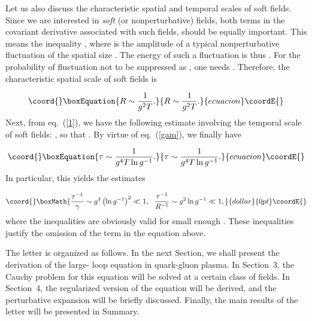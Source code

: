 \documentclass[a4paper,12pt]{article}
\begin{document}
Let us also discuss the characteristic spatial and temporal scales of soft fields. Since we are interested in {\it soft}
(or nonperturbative) fields, both terms in the covariant derivative associated with such fields, should be equally important.
This means the inequality \coordHE{}, where \coordHE{} is the amplitude of a typical nonperturbative
fluctuation of the spatial size \coordHE{}. The energy of such a fluctuation is thus \coordHE{}.
For the probability of fluctuation not to be suppressed as \coordHE{}, one
needs \coordHE{}. Therefore, the characteristic spatial scale of soft fields is

\begin{equation}\coord{}\boxEquation{
\label{spa}
R\sim\frac{1}{g^2T}.
}{
R\sim\frac{1}{g^2T}.
}{ecuacion}\coordE{}\end{equation}
Next, from eq.~(\ref{1}), we have the following estimate involving the temporal scale \myHighlight{$\tau$}\coordHE{} of soft fields: \coordHE{}, so that \coordHE{}. By virtue of eq.~(\ref{gam}),
we finally have

\begin{equation}\coord{}\boxEquation{
\label{tem}
\tau\sim\frac{1}{g^4T\ln g^{-1}}.
}{
\tau\sim\frac{1}{g^4T\ln g^{-1}}.
}{ecuacion}\coordE{}\end{equation}
In particular, this yields the estimates


$$\coord{}\boxMath{
\frac{\tau^{-1}}{\gamma}\sim g^4\left(\ln g^{-1}\right)^2\ll1,~~
\frac{\tau^{-1}}{R^{-1}}\sim g^2\ln g^{-1}\ll1,}{dollar}{0pt}\coordE{}$$
where the inequalities are obviously valid for small enough \coordHE{}. These inequalities justify
the omission of the term \coordHE{} in the equation \coordHE{} above.

The letter is organized as follows. In the next Section, we shall present the derivation of the large-\coordHE{} loop equation in
quark-gluon plasma. In Section~3, the Cauchy problem for this equation will be solved at a certain class of fields.
In Section~4, the regularized version of the equation will be derived, and the perturbative expansion will be briefly
discussed. Finally, the main results of the letter will be presented in Summary.
\end{document}
